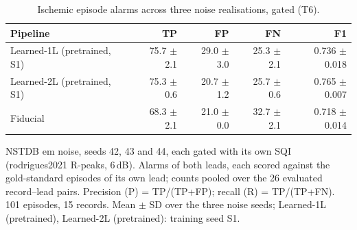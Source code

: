 \begin{table}[htbp]
\centering
\small
\caption{Ischemic episode alarms across three noise realisations, gated (T6).}
\label{tab:t6_robustness}
\begin{tabular}{lrrrr}
\toprule
Pipeline & TP & FP & FN & F1 \\
\midrule
Learned-1L (pretrained, S1) & 75.7 $\pm$ 2.1 & 29.0 $\pm$ 3.0 & 25.3 $\pm$ 2.1 & 0.736 $\pm$ 0.018 \\
Learned-2L (pretrained, S1) & 75.3 $\pm$ 0.6 & 20.7 $\pm$ 1.2 & 25.7 $\pm$ 0.6 & 0.765 $\pm$ 0.007 \\
Fiducial & 68.3 $\pm$ 2.1 & 21.0 $\pm$ 0.0 & 32.7 $\pm$ 2.1 & 0.718 $\pm$ 0.014 \\
\bottomrule
\end{tabular}

\par\smallskip\footnotesize NSTDB em noise, seeds 42, 43 and 44, each gated with its own SQI (rodrigues2021 R-peaks, 6\,dB). Alarms of both leads, each scored against the gold-standard episodes of its own lead; counts pooled over the 26 evaluated record--lead pairs. Precision (P) = TP/(TP+FP); recall (R) = TP/(TP+FN). 101 episodes, 15 records. Mean $\pm$ SD over the three noise seeds; Learned-1L (pretrained), Learned-2L (pretrained): training seed S1.
\end{table}
